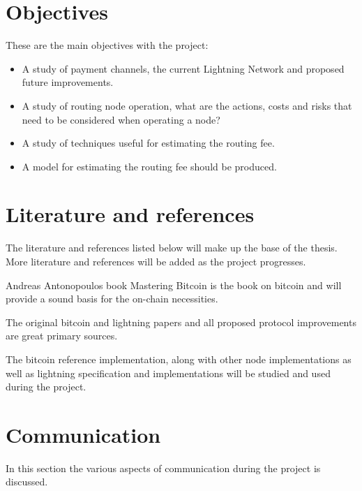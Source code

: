 \documentclass[10pt, titlepage, oneside, a4paper]{article}
\begin{document}
\section{Objectives}

These are the main objectives with the project:

\begin{itemize}
	\item A study of payment channels, the current Lightning Network and
	proposed future improvements.
	\item A study of routing node operation, what are the actions, costs and risks
	that need to be considered when operating a node?
	\item A study of techniques useful for estimating the routing fee.
	\item A model for estimating the routing fee should be produced.
\end{itemize}

\section{Literature and references}

The literature and references listed below will make up the base of the thesis. More literature and references will be added as the project progresses. 

Andreas Antonopoulos book Mastering Bitcoin\cite{antonopoulos:mastering:bitcoin} is the book on bitcoin and will provide a sound basis for the on-chain necessities.

The original bitcoin\cite{nakamoto:bitcoin} and lightning\cite{Poon:Dryja:lightning:network} papers and all proposed protocol improvements\cite{bip} are great primary sources.

The bitcoin reference implementation\cite{repository:bitcoin}, along with other node implementations\cite{repository:neutrino}\cite{repository:btcd} as well as lightning specification\cite{repository:lightning:rfc} and implementations\cite{repository:lnd}\cite{repository:clightning}\cite{repository:eclair} will be studied and used during the project.



\section{Communication}

In this section the various aspects of communication during the project is discussed.
\end{document}
